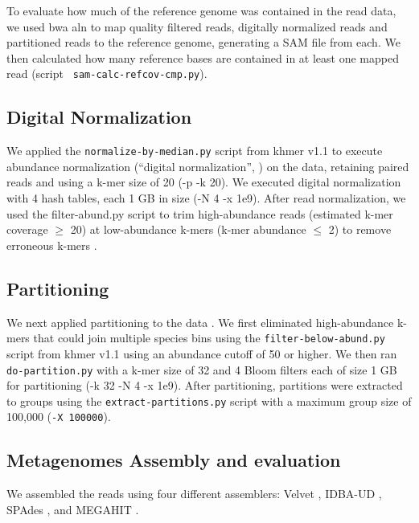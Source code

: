 To evaluate how much of the reference genome was contained in the read
data, we used bwa aln to map quality filtered reads, digitally
normalized reads and partitioned reads to the reference genome,
generating a SAM file from each.  We then calculated how many
reference bases are contained in at least one mapped read (script {\tt
sam-calc-refcov-cmp.py}).

\subsection*{Digital Normalization} 

We applied the {\tt normalize-by-median.py} script from khmer v1.1 to
execute abundance normalization (``digital normalization'', \cite{brown2012})  on the data, retaining paired reads and using a
k-mer size of 20 (-p -k 20).  We executed digital normalization with 4
hash tables, each 1 GB in size (-N 4 -x 1e9).  After read
normalization, we used the filter-abund.py script to trim
high-abundance reads (estimated k-mer coverage $\geq$ 20) at low-abundance
k-mers (k-mer abundance $\leq$ 2)   %
to remove erroneous k-mers  \cite{qingpeng2014} \cite{streaming}. 


\subsection*{Partitioning} 

We next applied partitioning to the data \cite{jpell2012, ahowe2014}.
We first eliminated high-abundance k-mers that could join multiple
species bins using the {\tt filter-below-abund.py} script from khmer v1.1 using an abundance cutoff of 50 or higher.
We then ran {\tt do-partition.py} with a k-mer size of 32 and 4 Bloom
filters each of size 1 GB for partitioning (-k 32 -N 4 -x 1e9).  After
partitioning, partitions were extracted to groups using the {\tt extract-partitions.py} script with a maximum group size of 100,000 ({\tt -X 100000}).

\subsection*{Metagenomes Assembly and evaluation}

We assembled the reads using four different assemblers: Velvet \cite{velvet}, IDBA-UD \cite{idba}, SPAdes \cite{spades}, and MEGAHIT \cite{megahit}.

